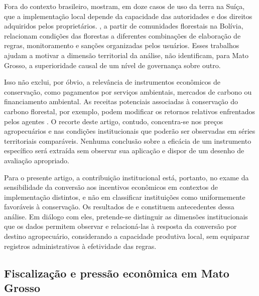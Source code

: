 Fora do contexto brasileiro,  mostram, em doze casos de uso da terra na Suíça, que a implementação local depende da capacidade das autoridades e dos direitos adquiridos pelos proprietários. , a partir de comunidades florestais na Bolívia, relacionam condições das florestas a diferentes combinações de elaboração de regras, monitoramento e sanções organizadas pelos usuários. Esses trabalhos ajudam a motivar a dimensão territorial da análise, não identificam, para Mato Grosso, a superioridade causal de um nível de governança sobre outro.

Isso não exclui, por óbvio, a relevância de instrumentos econômicos de conservação, como pagamentos por serviços ambientais, mercados de carbono ou financiamento ambiental. As receitas potenciais associadas à conservação do carbono florestal, por exemplo, podem modificar os retornos relativos enfrentados pelos agentes \cite{Angelsen2010,SticklerEtAl2013}. O recorte deste artigo, contudo, concentra-se nos preços agropecuários e nas condições institucionais que poderão ser observadas em séries territoriais comparáveis. Nenhuma conclusão sobre a eficácia de um instrumento específico será extraída sem observar sua aplicação e dispor de um desenho de avaliação apropriado.

Para o presente artigo, a contribuição institucional está, portanto, no exame da sensibilidade da conversão aos incentivos econômicos em contextos de implementação distintos, e não em classificar instituições como uniformemente favoráveis à conservação. Os resultados de  e  constituem antecedentes dessa análise. Em diálogo com eles, pretende-se distinguir as dimensões institucionais que os dados permitem observar e relacioná-las à resposta da conversão por destino agropecuário, considerando a capacidade produtiva local, sem equiparar registros administrativos à efetividade das regras.

\subsection{Fiscalização e pressão econômica em Mato Grosso}

